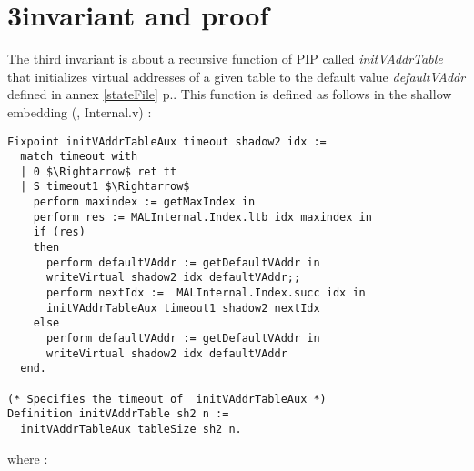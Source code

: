 \section{3\rd invariant and proof} \label{proof3}
The third invariant is about a recursive function of PIP called \textit{initVAddrTable} that initializes virtual addresses of a given table to the default value \textit{defaultVAddr} defined in annex \ref{stateFile} p.\pageref{stateFile}. This function is defined as follows in the shallow embedding (\cite{PIP}, Internal.v) : 
\begin{lstlisting}[caption = {initVAddrTable in the shallow embedding}, xleftmargin=-.02\textwidth,
xrightmargin=-.02\textwidth,mathescape=true]
Fixpoint initVAddrTableAux timeout shadow2 idx :=
  match timeout with
  | 0 $\Rightarrow$ ret tt
  | S timeout1 $\Rightarrow$
    perform maxindex := getMaxIndex in
    perform res := MALInternal.Index.ltb idx maxindex in
    if (res)
    then
      perform defaultVAddr := getDefaultVAddr in
      writeVirtual shadow2 idx defaultVAddr;;
      perform nextIdx :=  MALInternal.Index.succ idx in
      initVAddrTableAux timeout1 shadow2 nextIdx
    else  
      perform defaultVAddr := getDefaultVAddr in
      writeVirtual shadow2 idx defaultVAddr
  end.

(* Specifies the timeout of  initVAddrTableAux *) 
Definition initVAddrTable sh2 n :=
  initVAddrTableAux tableSize sh2 n.
\end{lstlisting} \vspace{4pt}
where :
